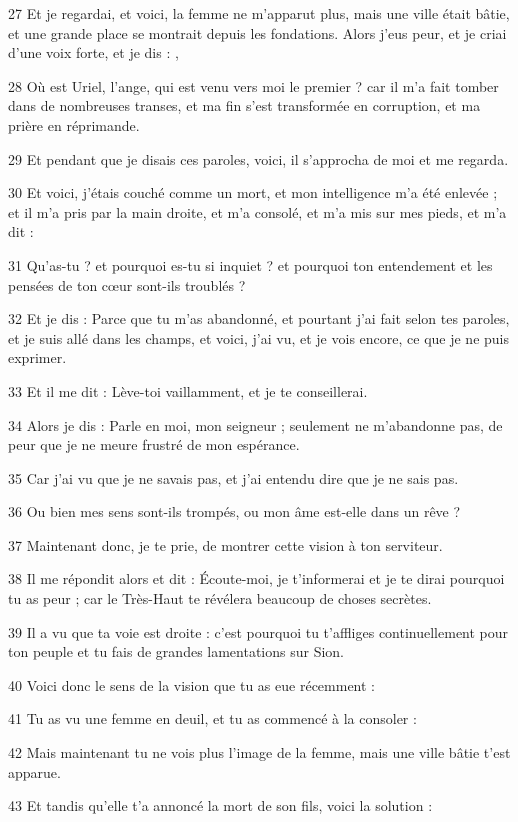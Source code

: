 \par 27 Et je regardai, et voici, la femme ne m'apparut plus, mais une ville était bâtie, et une grande place se montrait depuis les fondations. Alors j'eus peur, et je criai d'une voix forte, et je dis : ,
\par 28 Où est Uriel, l'ange, qui est venu vers moi le premier ? car il m'a fait tomber dans de nombreuses transes, et ma fin s'est transformée en corruption, et ma prière en réprimande.
\par 29 Et pendant que je disais ces paroles, voici, il s'approcha de moi et me regarda.
\par 30 Et voici, j'étais couché comme un mort, et mon intelligence m'a été enlevée ; et il m'a pris par la main droite, et m'a consolé, et m'a mis sur mes pieds, et m'a dit :
\par 31 Qu'as-tu ? et pourquoi es-tu si inquiet ? et pourquoi ton entendement et les pensées de ton cœur sont-ils troublés ?
\par 32 Et je dis : Parce que tu m'as abandonné, et pourtant j'ai fait selon tes paroles, et je suis allé dans les champs, et voici, j'ai vu, et je vois encore, ce que je ne puis exprimer.
\par 33 Et il me dit : Lève-toi vaillamment, et je te conseillerai.
\par 34 Alors je dis : Parle en moi, mon seigneur ; seulement ne m'abandonne pas, de peur que je ne meure frustré de mon espérance.
\par 35 Car j'ai vu que je ne savais pas, et j'ai entendu dire que je ne sais pas.
\par 36 Ou bien mes sens sont-ils trompés, ou mon âme est-elle dans un rêve ?
\par 37 Maintenant donc, je te prie, de montrer cette vision à ton serviteur.
\par 38 Il me répondit alors et dit : Écoute-moi, je t'informerai et je te dirai pourquoi tu as peur ; car le Très-Haut te révélera beaucoup de choses secrètes.
\par 39 Il a vu que ta voie est droite : c'est pourquoi tu t'affliges continuellement pour ton peuple et tu fais de grandes lamentations sur Sion.
\par 40 Voici donc le sens de la vision que tu as eue récemment :
\par 41 Tu as vu une femme en deuil, et tu as commencé à la consoler :
\par 42 Mais maintenant tu ne vois plus l'image de la femme, mais une ville bâtie t'est apparue.
\par 43 Et tandis qu'elle t'a annoncé la mort de son fils, voici la solution :

